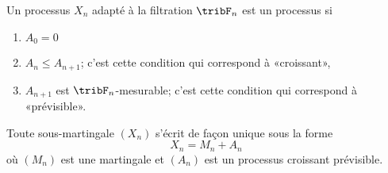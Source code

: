 \begin{definition}
	Un processus \( X_n\) adapté à la filtration \( \tribF_n\) est un processus  si
	\begin{enumerate}
		\item
		      \( A_0=0\)
		\item
		      \( A_n\leq A_{n+1}\); c'est cette condition qui correspond à «croissant»,
		\item
		      \( A_{n+1}\) est \( \tribF_n\)-mesurable; c'est cette condition qui correspond à «prévisible».
	\end{enumerate}
\end{definition}

\begin{proposition}
	Toute sous-martingale \( (X_n)\) s'écrit de façon unique sous la forme
	\begin{equation}\label{EqCCsAwbZ}
		X_n=M_n+A_n
	\end{equation}
	où \( (M_n)\) est une martingale et \( (A_n)\) est un processus croissant prévisible.
\end{proposition}

